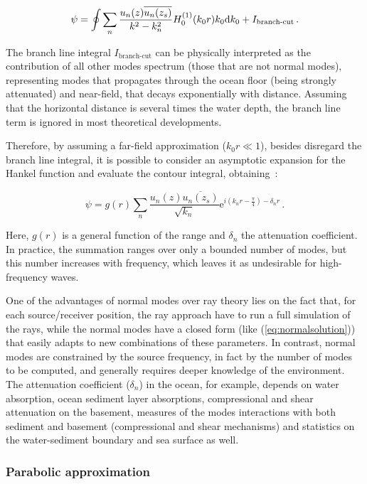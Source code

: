 \begin{equation}
\psi = \oint \sum_n{\frac{u_n(z)\overline{u_n(z_s)}}{k^2 -
k_n^2}H_0^{(1)}(k_0r)k_0\mathrm{d} k_0} + I_{\text{branch-cut}}\,.
\end{equation}

The branch line integral $I_{\text{branch-cut}}$ can be physically interpreted
as the contribution of all other modes spectrum (those that are not
normal modes), representing modes that propagates through the ocean floor
(being strongly attenuated) and near-field, that decays exponentially with
distance. Assuming that the horizontal distance is several times the water
depth, the branch line term is ignored in most theoretical developments.

Therefore, by assuming a far-field approximation ($k_0r \ll 1$), besides
disregard the branch line integral, it is possible to consider an asymptotic expansion for the
Hankel function and evaluate the contour integral, obtaining~\cite{Etter2013}:

\begin{equation}
\label{eq:normalsolution}
\psi =
g(r)\sum_n{\frac{u_n(z)\overline{u_n(z_s)}}{\sqrt{k_n}}\mathrm{e}^{i(k_nr-\tfrac{\pi}{4})-\delta_nr}}\,.
\end{equation}

Here, $g(r)$ is a general function of the range and $\delta_n$ the attenuation
coefficient. In practice, the summation ranges over only a bounded number of
modes, but this number increases with frequency, which leaves it as undesirable
for high-frequency waves. 

One of the advantages of normal modes over ray theory lies on the fact that, for
each source/receiver position, the ray approach have to run a full simulation of
the rays, while the normal modes have a closed form (like (\ref{eq:normalsolution})) that easily adapts to new combinations of these
parameters. In contrast, normal modes are constrained by the source frequency,
in fact by the number of modes to be computed, and generally requires deeper
knowledge of the environment. The attenuation
coefficient ($\delta_n$) in the ocean, for example, depends on water absorption,
ocean sediment layer absorptions, compressional and shear attenuation on the
basement, measures of the modes interactions with both sediment and
basement (compressional and shear mechanisms) and statistics on the
water-sediment boundary and sea surface as well.

\subsubsection{Parabolic approximation}

